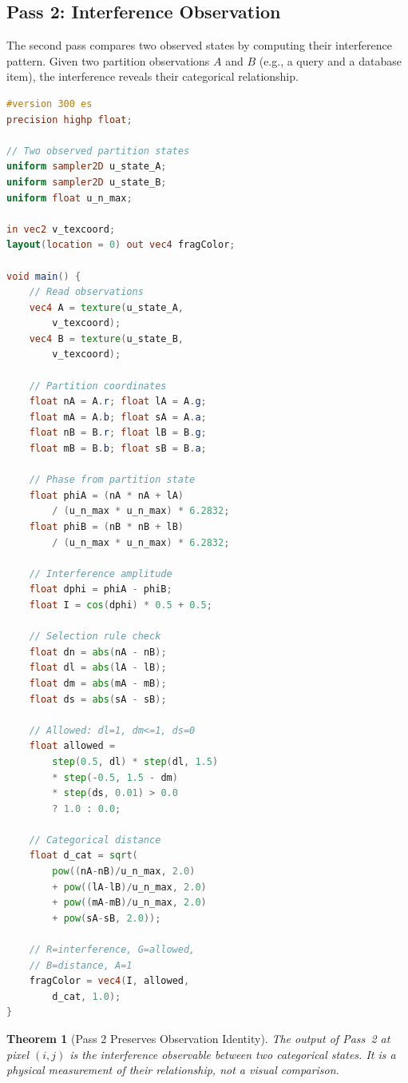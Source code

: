 \documentclass[11pt,twocolumn,a4paper]{article}
\newtheorem{theorem}{Theorem}[section]
\theoremstyle{definition}
\theoremstyle{remark}
\begin{document}
\subsection{Pass 2: Interference Observation}
\label{sec:pass2}

The second pass compares two observed states by computing their interference pattern. Given two partition observations $A$ and $B$ (e.g., a query and a database item), the interference reveals their categorical relationship.

\begin{lstlisting}[language=GLSL,caption={Pass 2: Interference Observation},label=lst:pass2]
#version 300 es
precision highp float;

// Two observed partition states
uniform sampler2D u_state_A;
uniform sampler2D u_state_B;
uniform float u_n_max;

in vec2 v_texcoord;
layout(location = 0) out vec4 fragColor;

void main() {
    // Read observations
    vec4 A = texture(u_state_A,
        v_texcoord);
    vec4 B = texture(u_state_B,
        v_texcoord);

    // Partition coordinates
    float nA = A.r; float lA = A.g;
    float mA = A.b; float sA = A.a;
    float nB = B.r; float lB = B.g;
    float mB = B.b; float sB = B.a;

    // Phase from partition state
    float phiA = (nA * nA + lA)
        / (u_n_max * u_n_max) * 6.2832;
    float phiB = (nB * nB + lB)
        / (u_n_max * u_n_max) * 6.2832;

    // Interference amplitude
    float dphi = phiA - phiB;
    float I = cos(dphi) * 0.5 + 0.5;

    // Selection rule check
    float dn = abs(nA - nB);
    float dl = abs(lA - lB);
    float dm = abs(mA - mB);
    float ds = abs(sA - sB);

    // Allowed: dl=1, dm<=1, ds=0
    float allowed =
        step(0.5, dl) * step(dl, 1.5)
        * step(-0.5, 1.5 - dm)
        * step(ds, 0.01) > 0.0
        ? 1.0 : 0.0;

    // Categorical distance
    float d_cat = sqrt(
        pow((nA-nB)/u_n_max, 2.0)
        + pow((lA-lB)/u_n_max, 2.0)
        + pow((mA-mB)/u_n_max, 2.0)
        + pow(sA-sB, 2.0));

    // R=interference, G=allowed,
    // B=distance, A=1
    fragColor = vec4(I, allowed,
        d_cat, 1.0);
}
\end{lstlisting}

\begin{theorem}[Pass 2 Preserves Observation Identity]
\label{thm:pass2_identity}
The output of Pass~2 at pixel $(i,j)$ is the interference observable between two categorical states. It is a physical measurement of their relationship, not a visual comparison.
\end{theorem}
\end{document}
